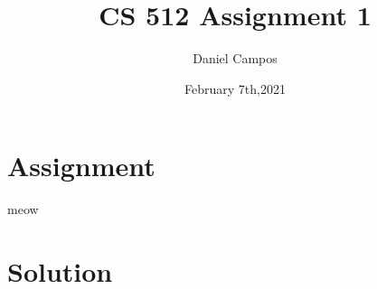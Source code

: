 \documentclass[11pt]{article}
\title{CS 512 Assignment 1}
\author{Daniel Campos}
\date{February 7th,2021}
\begin{document}
\maketitle
\section{Assignment}
meow
\section{Solution}
\end{document}
